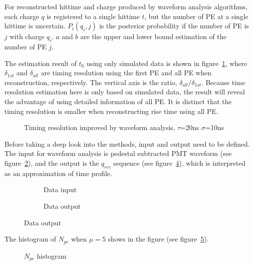 For reconstructed hittime and charge produced by waveform analysis algorithms, each charge $q$ is registered to a single hittime $t$, but the number of PE at a single hittime is uncertain. $P_{i}(q_{i},j)$ is the posterior probability if the number of PE is $j$ with charge $q_{i}$. $a$ and $b$ are the upper and lower bound estimation of the number of PE $j$. 

The estimation result of $t_{0}$ using only simulated data is shown in figure~\ref{fig:reso-diff}, where $\delta_{1st}$ and $\delta_{all}$ are timing resolution using the first PE and all PE when reconstruction, respectively. The vertical axis is the ratio, $\delta_{all}/\delta_{1st}$. Because time resolution estimation here is only based on simulated data, the result will reveal the advantage of using detailed information of all PE. It is distinct that the timing resolution is smaller when reconstructing rise time using all PE. 

\begin{figure}[H]
    \centering
    \scalebox{0.5}{}
    \caption{\label{fig:reso-diff} Timing resolution improved by waveform analysis, $\tau$=20ns $\sigma$=10ns}
\end{figure}

Before taking a deep look into the methods, input and output need to be defined. The input for waveform analysis is pedestal subtracted PMT waveform (see figure~\ref{fig:input}), and the output is the $q_{rec}$ sequence (see figure~\ref{fig:output}), which is interpreted as an approximation of time profile. 

\begin{figure}[H]
\begin{minipage}[b]{.5\textwidth}
\begin{figure}[H]
    \centering
    \resizebox{\textwidth}{!}{}
    \caption{\label{fig:input} Data input}
\end{figure}
\end{minipage}
\begin{minipage}[b]{.5\textwidth}
\begin{figure}[H]
    \centering
    \resizebox{\textwidth}{!}{}
    \caption{\label{fig:output} Data output}
\end{figure}
\end{minipage}
\end{figure}

The histogram of $N_{pe}$ when $\mu=5$ shows in the figure (see figure~\ref{fig:penum}). 

\begin{figure}[H]
    \centering
    \scalebox{0.4}{}
    \caption{\label{fig:penum} $N_{pe}$ histogram}
\end{figure}

